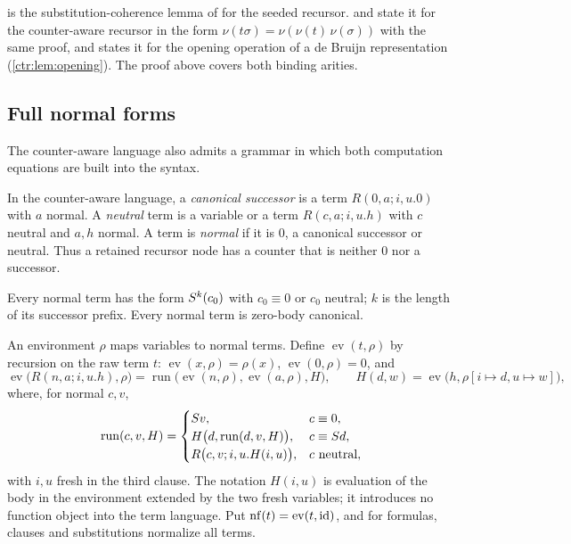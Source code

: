 \begin{remark}
 is the substitution-coherence lemma of 
for the seeded recursor.  and  state it for
the counter-aware recursor in the form $\nu(t\sigma)=\nu(\nu(t)\,\nu(\sigma))$ with the same
proof, and  states it for the opening operation of a de Bruijn
representation (\cref{ctr:lem:opening}). The proof above covers both binding arities.
\end{remark}

\subsection{Full normal forms}

The counter-aware language also admits a grammar in which both computation equations are
built into the syntax.

\begin{definition}\label{ctr:def:normal}
In the counter-aware language, a \emph{canonical successor} is a term $R(0,a;i,u.0)$ with $a$
normal. A \emph{neutral} term is a variable or a term $R(c,a;i,u.h)$ with $c$ neutral and
$a,h$ normal. A term is \emph{normal} if it is $0$, a canonical successor or neutral. Thus a
retained recursor node has a counter that is neither $0$ nor a successor.
\end{definition}

Every normal term has the form $S^k(c_0)$ with $c_0\equiv 0$ or $c_0$ neutral; $k$ is the
length of its successor prefix. Every normal term is zero-body canonical.

\begin{definition}\label{ctr:def:eval}
An environment $\rho$ maps variables to normal terms. Define $\operatorname{ev}(t,\rho)$ by
recursion on the raw term $t$: $\operatorname{ev}(x,\rho)=\rho(x)$,
$\operatorname{ev}(0,\rho)=0$, and
\[
 \operatorname{ev}\bigl(R(n,a;i,u.h),\rho\bigr)
 =\operatorname{run}\bigl(\operatorname{ev}(n,\rho),\operatorname{ev}(a,\rho),H\bigr),
 \qquad H(d,w)=\operatorname{ev}\bigl(h,\rho[i\mapsto d,u\mapsto w]\bigr),
\]
where, for normal $c,v$,
\begin{equation}\label{ctr:eq:run}
 \operatorname{run}(c,v,H)=
 \begin{cases}
  S v, & c\equiv 0,\\
  H\bigl(d,\operatorname{run}(d,v,H)\bigr), & c\equiv S d,\\
  R\bigl(c,v;i,u.H(i,u)\bigr), & c \text{ neutral},
 \end{cases}
\end{equation}
with $i,u$ fresh in the third clause. The notation $H(i,u)$ is evaluation of the body in the
environment extended by the two fresh variables; it introduces no function object into the
term language. Put $\operatorname{nf}(t)=\operatorname{ev}(t,\mathrm{id})$, and for formulas, clauses and
substitutions normalize all terms.
\end{definition}

